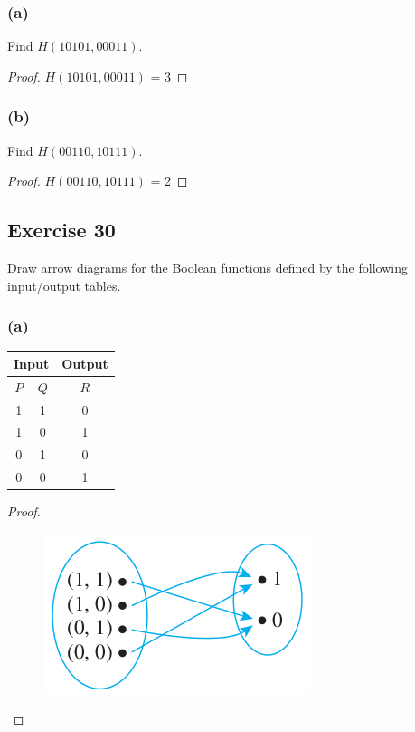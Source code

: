 \documentclass[14pt]{extarticle}
\newcommand{\cy}{\color{cyan}}
\begin{document}
\subsubsection{(a)}
Find \(H(10101, 00011)\).

\begin{proof}
\(H(10101, 00011)\) = 3
\end{proof}

\subsubsection{(b)}
Find \(H(00110, 10111)\).

\begin{proof}
\(H(00110, 10111)\) = 2
\end{proof}

\subsection{Exercise 30}
Draw arrow diagrams for the Boolean functions defined by the following input/output tables.

\subsubsection{(a)}
\begin{center}
\begin{tabular}{|cc|c|}
\hline
\multicolumn{2}{|c|}{\cy Input} & {\cy Output} \\
\hline
$P$ & $Q$ & $R$ \\
\hline
1 & 1 & 0 \\
\hline
1 & 0 & 1 \\
\hline
0 & 1 & 0 \\
\hline
0 & 0 & 1 \\
\hline
\end{tabular}
\end{center}

\begin{proof}
\begin{figure}[ht!]
\centering
\includegraphics[scale=0.6]{../images/7.1.30.a.png}
\end{figure}
\end{proof}
\end{document}
